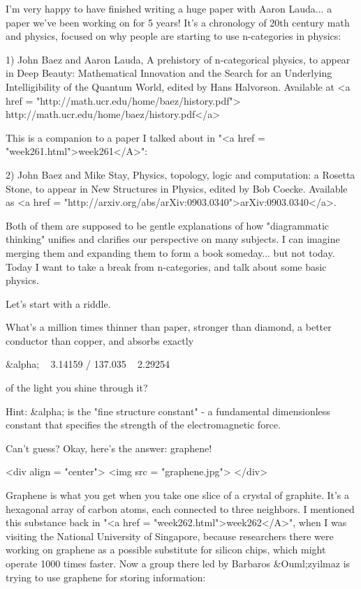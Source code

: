 

I'm very happy to have finished writing a huge paper with Aaron
Lauda... a paper we've been working on for 5 years!  It's a chronology
of 20th century math and physics, focused on why people are
starting to use n-categories in physics:

1) John Baez and Aaron Lauda, A prehistory of n-categorical physics,
to appear in Deep Beauty: Mathematical Innovation and the Search for 
an Underlying Intelligibility of the Quantum World, edited by Hans 
Halvorson.  Available at <a href = 
"http://math.ucr.edu/home/baez/history.pdf">
http://math.ucr.edu/home/baez/history.pdf</a>

This is a companion to a paper I talked about in "<a href =
"week261.html">week261</A>":

2) John Baez and Mike Stay, Physics, topology, logic and computation:
a Rosetta Stone, to appear in New Structures in Physics, edited by Bob
Coecke.  Available as <a href =
"http://arxiv.org/abs/arXiv:0903.0340">arXiv:0903.0340</a>.

Both of them are supposed to be gentle explanations of how 
"diagrammatic thinking" unifies and clarifies our perspective
on many subjects.  I can imagine merging them and expanding
them to form a book someday... but not today.  Today I want to 
take a break from n-categories, and talk about some basic physics.

Let's start with a riddle. 

What's a million times thinner than paper, stronger than diamond,
a better conductor than copper, and absorbs exactly 

\pi  &alpha; ~ 3.14159 / 137.035 ~ 2.29254%
 
of the light you shine through it?   

Hint: &alpha; is the "fine structure constant" - a fundamental 
dimensionless constant that specifies the strength of the 
electromagnetic force.

Can't guess?  Okay, here's the answer: graphene!  

<div align = "center">
<img src = "graphene.jpg">
</div>

Graphene is what you get when you take one slice of a crystal of
graphite.  It's a hexagonal array of carbon atoms, each connected to
three neighbors.  I mentioned this substance back in "<a href =
"week262.html">week262</A>", when I was visiting the National
University of Singapore, because researchers there were working on
graphene as a possible substitute for silicon chips, which might
operate 1000 times faster.  Now a group there led by Barbaros &Ouml;zyilmaz
is trying to use graphene for storing information:

